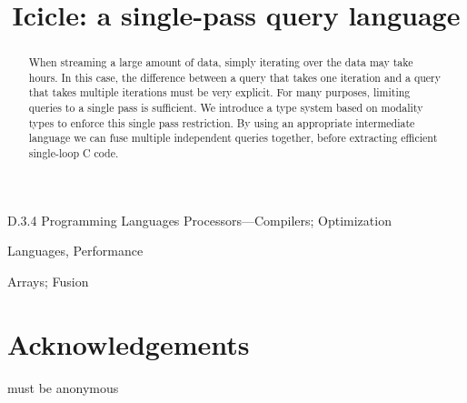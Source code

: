 \documentclass[preprint]{sigplanconf}
\begin{document}
\doi{}

\title{Icicle: a single-pass query language}


\maketitle
\makeatactive

\begin{abstract}
When streaming a large amount of data, simply iterating over the data may take hours.
In this case, the difference between a query that takes one iteration and a query that takes multiple iterations must be very explicit.
For many purposes, limiting queries to a single pass is sufficient.
We introduce a type system based on modality types to enforce this single pass restriction.
By using an appropriate intermediate language we can fuse multiple independent queries together, before extracting efficient single-loop C code.
\end{abstract}


\category
	{D.3.4}
	{Programming Languages}
	{Processors---Compilers; Optimization}

\terms
	Languages, Performance

\keywords
	Arrays; Fusion











\section*{Acknowledgements}
must be anonymous



\end{document}
